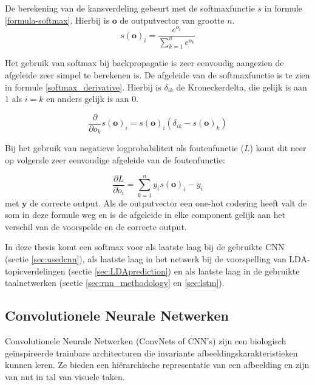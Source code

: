 De berekening van de kansverdeling gebeurt met de softmaxfunctie $s$ in formule \eqref{formula-softmax}. Hierbij is $\mathbf{o}$ de outputvector van grootte $n$.
\begin{equation}
s(\textbf{o})_i = \frac{e^{o_i}}{\sum^{n}_{k=1}{e^{o_k}}}
\label{formula-softmax}
\end{equation}

Het gebruik van softmax bij backpropagatie is zeer eenvoudig aangezien de afgeleide zeer simpel te berekenen is. De afgeleide van de softmaxfunctie is te zien in formule \eqref{softmax_derivative}. Hierbij is $\delta_{ik}$ de Kroneckerdelta, die gelijk is aan $1$ als $i = k$ en anders gelijk is aan $0$.

\begin{equation}
    \frac{\partial}{\partial o_k}s(\textbf{o})_i =  s(\textbf{o})_i(\delta_{ik} - s(\textbf{o})_k)
    \label{softmax_derivative}
\end{equation}

Bij het gebruik van negatieve logprobabiliteit als foutenfunctie ($L$) komt dit neer op volgende zeer eenvoudige afgeleide van de foutenfunctie:

\begin{equation}
    \frac{\partial L}{\partial o_i} = \sum_{k=1}^n{y_i}s(\textbf{o})_i - y_i
\end{equation}
met $\textbf{y}$ de correcte output. Als de outputvector een one-hot codering heeft valt de som in deze formule weg en is de afgeleide in elke component gelijk aan het verschil van de voorspelde en de correcte output\cite{Bishop:1995:NNP:525960}. 

In deze thesis komt een softmax voor als laatste laag bij de gebruikte CNN (sectie \ref{sec:usedcnn}), als laatste laag in het netwerk bij de voorspelling van LDA-topicverdelingen (sectie \ref{sec:LDAprediction}) en als laatste laag in de gebruikte taalnetwerken (sectie \ref{sec:rnn_methodology} en \ref{sec:lstm}).

\subsection{Convolutionele Neurale Netwerken}
\label{sec:CNN}
Convolutionele Neurale Netwerken (ConvNets of CNN's) zijn een biologisch ge\" inspireerde trainbare architecturen die invariante afbeeldingskarakteristieken kunnen leren.\cite{LeCun2010} Ze bieden een hi\"erarchische representatie van een afbeelding en zijn van nut in tal van visuele taken\cite{Ciresan2012,Girshick2014,Zhou2015}.

